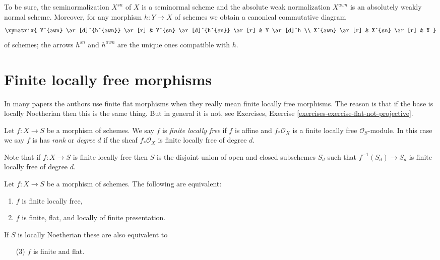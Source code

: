 \noindent
To be sure, the seminormalization $X^{sn}$ of $X$ is a seminormal
scheme and the absolute weak normalization $X^{awn}$ is an
absolutely weakly normal scheme.
Moreover, for any morphism $h : Y \to X$ of schemes we obtain a
canonical commutative diagram
$$
\xymatrix{
Y^{awn} \ar[d]^{h^{awn}} \ar[r] &
Y^{sn} \ar[d]^{h^{sn}} \ar[r] &
Y \ar[d]^h \\
X^{awn} \ar[r] &
X^{sn} \ar[r] &
X
}
$$
of schemes; the arrows $h^{sn}$ and $h^{awn}$ are the unique
ones compatible with $h$.






\section{Finite locally free morphisms}
\label{section-finite-locally-free}

\noindent
In many papers the authors use finite flat morphisms when they really mean
finite locally free morphisms. The reason is that if the base is locally
Noetherian then this is the same thing. But in general it is not, see
Exercises, Exercise \ref{exercises-exercise-flat-not-projective}.

\begin{definition}
\label{definition-finite-locally-free}
Let $f : X \to S$ be a morphism of schemes.
We say $f$ is {\it finite locally free} if $f$ is
affine and $f_*\mathcal{O}_X$ is a finite locally
free $\mathcal{O}_S$-module. In this case we say $f$ is
has {\it rank} or {\it degree} $d$
if the sheaf $f_*\mathcal{O}_X$ is finite locally free of degree $d$.
\end{definition}

\noindent
Note that if $f : X \to S$ is finite locally free then $S$ is the disjoint
union of open and closed subschemes $S_d$ such that $f^{-1}(S_d) \to S_d$
is finite locally free of degree $d$.

\begin{lemma}
\label{lemma-finite-flat}
Let $f : X \to S$ be a morphism of schemes.
The following are equivalent:
\begin{enumerate}
\item $f$ is finite locally free,
\item $f$ is finite, flat, and locally of finite presentation.
\end{enumerate}
If $S$ is locally Noetherian these are also equivalent to
\begin{enumerate}
\item[(3)] $f$ is finite and flat.
\end{enumerate}
\end{lemma}

